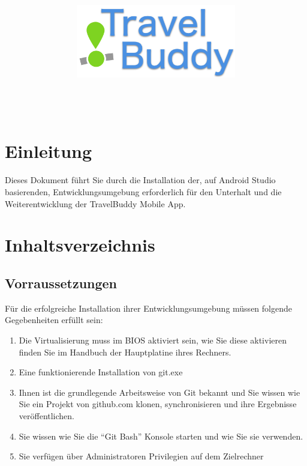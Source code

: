 \documentclass[a4paper,10pt,xetex]{article}
\title{
  \includegraphics[width=7cm]{travel-buddy_white}\\[\bigskipamount]
  \documenttitle\\[\bigskipamount]
}
\author{\documentauthors}
\date{\parbox{\linewidth}{\centering%
  IT15TA ZH \hspace*{3cm} Gruppe 3\endgraf\bigskip
  Dokumentversion \documentversion, \documentdate\endgraf
}}
\begin{document}

\maketitle\newpage

\section{Einleitung}
Dieses Dokument führt Sie durch die Installation der, auf Android Studio basierenden, Entwicklungsumgebung erforderlich für den Unterhalt und die Weiterentwicklung der TravelBuddy Mobile App.

\section{Inhaltsverzeichnis}
{
\hypersetup{linkcolor=black}
\setcounter{tocdepth}{3}
\renewcommand{\baselinestretch}{0.99}\normalsize
\tableofcontents
\renewcommand{\baselinestretch}{1.0}\normalsize
}

\newpage

\subsection{Vorraussetzungen}
Für die erfolgreiche Installation ihrer Entwicklungsumgebung müssen folgende Gegebenheiten erfüllt sein:
\begin{enumerate}
  \item Die Virtualisierung muss im BIOS aktiviert sein, wie Sie diese aktivieren finden Sie im Handbuch der Hauptplatine ihres Rechners.
  \item Eine funktionierende Installation von git.exe
  \item Ihnen ist die grundlegende Arbeitsweise von Git bekannt und Sie wissen wie Sie ein Projekt von github.com klonen, synchronisieren und ihre Ergebnisse veröffentlichen.
  \item Sie wissen wie Sie die ``Git Bash'' Konsole starten und wie Sie sie verwenden.
  \item Sie verfügen über Administratoren Privilegien auf dem Zielrechner
\end{enumerate}
\end{document}
